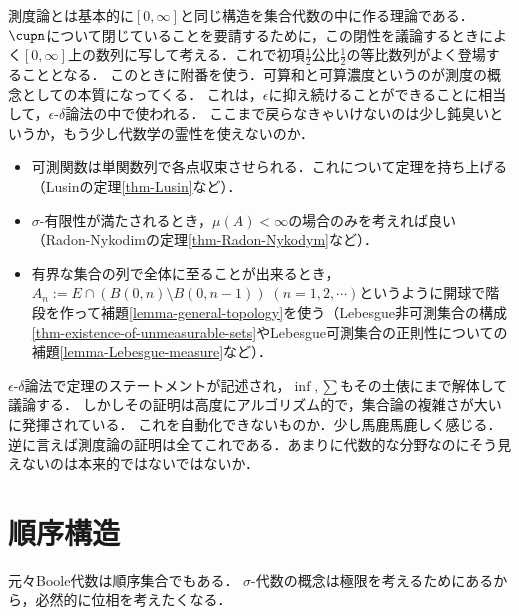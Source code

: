 \documentclass[uplatex, dvipdfmx]{jsreport}
\begin{document}
\begin{discussion}
    測度論とは基本的に$[0,\infty]$と同じ構造を集合代数の中に作る理論である．
    $\cupn$について閉じていることを要請するために，この閉性を議論するときによく$[0,\infty]$上の数列に写して考える．これで初項$\frac{1}{2}$公比$\frac{1}{2}$の等比数列がよく登場することとなる．
    このときに附番を使う．可算和と可算濃度というのが測度の概念としての本質になってくる．
    これは，$\epsilon$に抑え続けることができることに相当して，$\epsilon$-$\delta$論法の中で使われる．
    ここまで戻らなきゃいけないのは少し鈍臭いというか，もう少し代数学の霊性を使えないのか．
    \begin{itemize}
        \item 可測関数は単関数列で各点収束させられる．これについて定理を持ち上げる（Lusinの定理\ref{thm-Lusin}など）．
        \item $\sigma$-有限性が満たされるとき，$\mu(A)<\infty$の場合のみを考えれば良い（Radon-Nykodimの定理\ref{thm-Radon-Nykodym}など）．
        \item 有界な集合の列で全体に至ることが出来るとき，$A_n:=E\cap(B(0,n)\setminus B(0,n-1))\;(n=1,2,\cdots)$というように開球で階段を作って補題\ref{lemma-general-topology}を使う（Lebesgue非可測集合の構成\ref{thm-existence-of-unmeasurable-sets}やLebesgue可測集合の正則性についての補題\ref{lemma-Lebesgue-measure}など）．
    \end{itemize}
\end{discussion}

\begin{discussion}[$\epsilon$-$\delta$]
    $\epsilon$-$\delta$論法で定理のステートメントが記述され，$\inf,\sum$もその土俵にまで解体して議論する．
    しかしその証明は高度にアルゴリズム的で，集合論の複雑さが大いに発揮されている．
    これを自動化できないものか．少し馬鹿馬鹿しく感じる．
    逆に言えば測度論の証明は全てこれである．あまりに代数的な分野なのにそう見えないのは本来的ではないではないか．
\end{discussion}

\section{順序構造}

\begin{tcolorbox}[colframe=ForestGreen, colback=ForestGreen!10!white,breakable,colbacktitle=ForestGreen!40!white,coltitle=black,fonttitle=\bfseries\sffamily,
title=]
    元々Boole代数は順序集合でもある．
    $\sigma$-代数の概念は極限を考えるためにあるから，必然的に位相を考えたくなる．
\end{tcolorbox}
\end{document}
